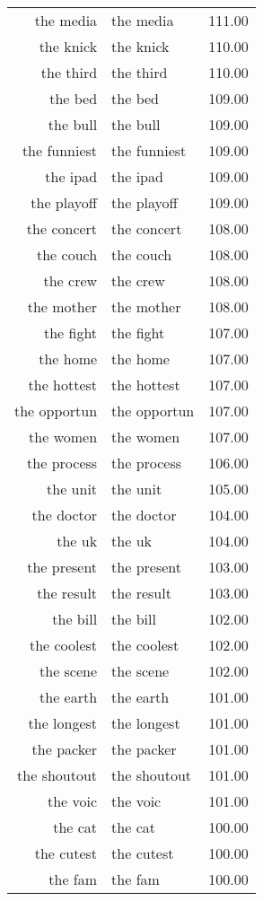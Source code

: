\begin{table}[ht]
\begin{tabular}{rlr}
  the media & the media & 111.00 \\ 
  the knick & the knick & 110.00 \\ 
  the third & the third & 110.00 \\ 
  the bed & the bed & 109.00 \\ 
  the bull & the bull & 109.00 \\ 
  the funniest & the funniest & 109.00 \\ 
  the ipad & the ipad & 109.00 \\ 
  the playoff & the playoff & 109.00 \\ 
  the concert & the concert & 108.00 \\ 
  the couch & the couch & 108.00 \\ 
  the crew & the crew & 108.00 \\ 
  the mother & the mother & 108.00 \\ 
  the fight & the fight & 107.00 \\ 
  the home & the home & 107.00 \\ 
  the hottest & the hottest & 107.00 \\ 
  the opportun & the opportun & 107.00 \\ 
  the women & the women & 107.00 \\ 
  the process & the process & 106.00 \\ 
  the unit & the unit & 105.00 \\ 
  the doctor & the doctor & 104.00 \\ 
  the uk & the uk & 104.00 \\ 
  the present & the present & 103.00 \\ 
  the result & the result & 103.00 \\ 
  the bill & the bill & 102.00 \\ 
  the coolest & the coolest & 102.00 \\ 
  the scene & the scene & 102.00 \\ 
  the earth & the earth & 101.00 \\ 
  the longest & the longest & 101.00 \\ 
  the packer & the packer & 101.00 \\ 
  the shoutout & the shoutout & 101.00 \\ 
  the voic & the voic & 101.00 \\ 
  the cat & the cat & 100.00 \\ 
  the cutest & the cutest & 100.00 \\ 
  the fam & the fam & 100.00 \\ 

\end{tabular}
\end{table}
